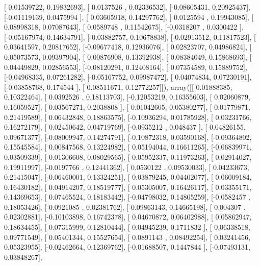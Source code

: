 \documentclass{article}
\begin{document}
       [ 0.01539722,  0.19832693],
       [ 0.0137526 ,  0.02336532],
       [-0.08605431,  0.20925437],
       [-0.01119139,  0.0475994 ],
       [ 0.03605918,  0.14297762],
       [ 0.0125594 ,  0.19943085],
       [ 0.08998318,  0.07087643],
       [ 0.0589748 ,  0.11542675],
       [-0.0318207 ,  0.0300422 ],
       [-0.05167974,  0.14634791],
       [-0.03882757,  0.10678838],
       [-0.02913512,  0.11817523],
       [ 0.03641597,  0.20817652],
       [-0.09677418,  0.12936076],
       [ 0.02823707,  0.04986824],
       [ 0.05073573,  0.09397904],
       [ 0.00876908,  0.13392938],
       [ 0.08384049,  0.15868693],
       [ 0.04449829,  0.02856553],
       [-0.08120291,  0.12408164],
       [ 0.07354589,  0.15889752],
       [-0.04968335,  0.07261282],
       [-0.05167752,  0.09987472],
       [ 0.04074834,  0.07230191],
       [-0.03858768,  0.174544  ],
       [ 0.08511671,  0.12772257]]), array([[ 0.01888385,  0.10322464],
       [ 0.0392526 ,  0.18113703],
       [-0.12053219,  0.16355603],
       [ 0.02060879,  0.16059527],
       [ 0.03567271,  0.2038808 ],
       [ 0.01042605,  0.05380277],
       [ 0.01779871,  0.21419589],
       [ 0.06432848,  0.18863575],
       [-0.10936294,  0.01785928],
       [ 0.03231766,  0.16272179],
       [ 0.02450642,  0.04719769],
       [-0.0935212 ,  0.048437  ],
       [ 0.04826155,  0.09671377],
       [-0.08009947,  0.14274791],
       [-0.10872318,  0.03590168],
       [-0.09364802,  0.15545584],
       [ 0.00847568,  0.13224982],
       [ 0.05194044,  0.16611265],
       [-0.06839971,  0.03509339],
       [-0.01306608,  0.08029565],
       [-0.05952337,  0.11973263],
       [ 0.02914027,  0.19911997],
       [-0.0197766 ,  0.12441362],
       [ 0.0530122 ,  0.09530033],
       [ 0.04233673,  0.21415047],
       [-0.06460001,  0.13324251],
       [ 0.03879245,  0.04402077],
       [ 0.06009184,  0.16430182],
       [ 0.04914207,  0.18519777],
       [ 0.05305007,  0.16426117],
       [ 0.03355171,  0.14369653],
       [ 0.07465524,  0.18183442],
       [-0.04798032,  0.14805259],
       [-0.0582457 ,  0.18053426],
       [-0.0921085 ,  0.02381762],
       [-0.09863143,  0.14665198],
       [ 0.004307  ,  0.02302881],
       [-0.10103898,  0.16742378],
       [ 0.04670872,  0.06402988],
       [ 0.05862947,  0.18634455],
       [ 0.07315999,  0.12810444],
       [ 0.04945239,  0.1711832 ],
       [ 0.06338518,  0.09771549],
       [ 0.05401344,  0.15527654],
       [ 0.0891143 ,  0.08492254],
       [ 0.03241456,  0.05323955],
       [-0.02462664,  0.12369762],
       [-0.01688507,  0.1447844 ],
       [-0.07493131,  0.03848267],
\end{document}
